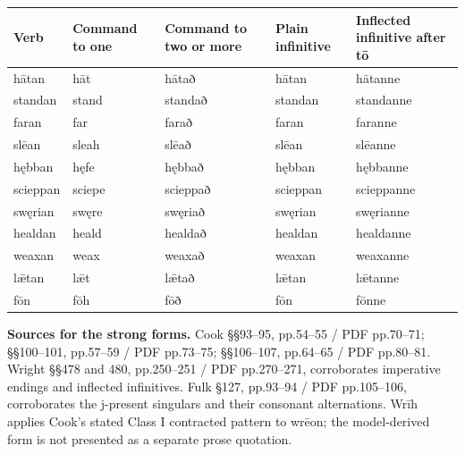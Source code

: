 \par\begingroup
\fontsize{10.5}{13.2}\selectfont
\setlength{\LTleft}{0pt}\setlength{\LTright}{\fill}
\noindent
\begin{tabular}{@{}>{\raggedright\arraybackslash}p{17.16mm}>{\raggedright\arraybackslash}p{17.42mm}>{\raggedright\arraybackslash}p{24.54mm}>{\raggedright\arraybackslash}p{21.8mm}>{\raggedright\arraybackslash}p{31.83mm}@{}}
\toprule
\textbf{Verb} & \textbf{Command to one} & \textbf{Command to two or more} & \textbf{Plain infinitive} & \textbf{Inflected infinitive after tō} \\
\midrule
hātan & hāt & hātað & hātan & hātanne \\
standan & stand & standað & standan & standanne \\
faran & far & farað & faran & faranne \\
slēan & sleah & slēað & slēan & slēanne \\
hębban & hęfe & hębbað & hębban & hębbanne \\
scieppan & sciepe & scieppað & scieppan & scieppanne \\
swęrian & swęre & swęriað & swęrian & swęrianne \\
healdan & heald & healdað & healdan & healdanne \\
weaxan & weax & weaxað & weaxan & weaxanne \\
lǣtan & lǣt & lǣtað & lǣtan & lǣtanne \\
fōn & fōh & fōð & fōn & fōnne \\
\bottomrule
\end{tabular}
\par\endgroup

\textbf{Sources for the strong forms.} Cook §§93–95, pp.54–55 /\allowbreak{} PDF pp.70–71; §§100–101, pp.57–59 /\allowbreak{} PDF pp.73–75; §§106–107, pp.64–65 /\allowbreak{} PDF pp.80–81. Wright §§478 and 480, pp.250–251 /\allowbreak{} PDF pp.270–271, corroborates imperative endings and inflected infinitives. Fulk §127, pp.93–94 /\allowbreak{} PDF pp.105–106, corroborates the j-present singulars and their consonant alternations. Wrīh applies Cook’s stated Class I contracted pattern to wrēon; the model-derived form is not presented as a separate prose quotation.

